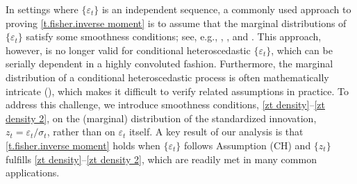 \documentclass[ejsv2]{imsart}
\theoremstyle{plain}
\theoremstyle{definition}
\theoremstyle{remark}
\begin{document}


In settings where
$\{\varepsilon_t\}$ is an independent sequence, a commonly used approach to proving \eqref{t.fisher.inverse moment}
is to assume that
the marginal
distributions
of $\{\varepsilon_t\}$ satisfy some smoothness conditions; see, e.g.,
\cite{Papangelou1994},
\cite{Findley2002}, and
\cite{Ing2003a}.
This approach, however, is no longer valid for conditional heteroscedastic $\{\varepsilon_t\}$,
which can be
serially dependent in a highly convoluted fashion.
Furthermore, the marginal distribution of a conditional heteroscedastic process is often mathematically intricate
(\citealp{Francq19}), which makes
it difficult to verify related assumptions in practice.
To address this challenge, we
introduce smoothness conditions,
\eqref{zt density}--\eqref{zt density 2},
on the (marginal) distribution of 
the standardized innovation,
$z_t=\varepsilon_t/\sigma_t$,
rather than on
$\varepsilon_t$ itself. 
 A key result of our analysis is that \eqref{t.fisher.inverse moment} holds when $\{\varepsilon_t\}$ follows Assumption (CH) and $\{z_t\}$  fulfills \eqref{zt density}--\eqref{zt density 2},
which are readily met in many common applications.
\end{document}
